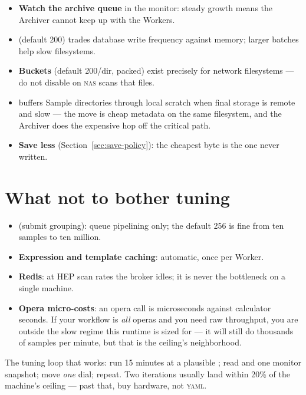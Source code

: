 \begin{itemize}
  \item \textbf{Watch the archive queue} in the monitor: steady growth means the
        Archiver cannot keep up with the Workers.
  \item {} (default 200) trades database write frequency
        against memory; larger batches help slow filesystems.
  \item \textbf{Buckets} (default 200/dir, packed) exist precisely for network
        filesystems --- do not disable  on \textsc{nas} scans that
         files.
  \item {} buffers Sample directories through
        local scratch when final storage is remote and slow --- the move is cheap
        metadata on the same filesystem, and the Archiver does the expensive hop off
        the critical path.
  \item \textbf{Save less} (Section~\ref{sec:save-policy}): the cheapest byte is the
        one never written.
\end{itemize}

\section{What not to bother tuning}
\label{sec:perf-non-dials}

\begin{itemize}
  \item {} (submit grouping): queue pipelining only; the default
        256 is fine from ten samples to ten million.
  \item \textbf{Expression and template caching}: automatic, once per Worker.
  \item \textbf{Redis}: at HEP scan rates the broker idles; it is never the bottleneck
        on a single machine.
  \item \textbf{Opera micro-costs}: an opera call is microseconds against calculator
        seconds. If your workflow is \emph{all} operas and you need raw throughput,
        you are outside the slow regime this runtime is sized for --- it will still do
        thousands of samples per minute, but that is the ceiling's neighborhood.
\end{itemize}

\begin{jtip}
The tuning loop that works: run 15 minutes at a plausible ; read
 and one monitor snapshot; move \emph{one} dial; repeat. Two
iterations usually land within 20\% of the machine's ceiling --- past that, buy
hardware, not \textsc{yaml}.
\end{jtip}
